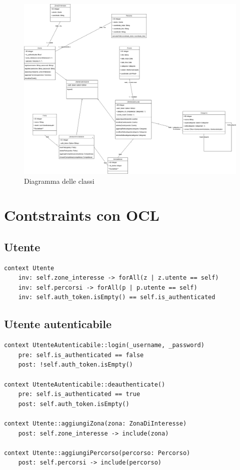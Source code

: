 \documentclass{article}
\begin{document}
\begin{figure}[htbp]
    \centering
    \includegraphics[width=1\textwidth]{Images/class_diagram.png}
    \caption{Diagramma delle classi}
    \label{fig:class-diagram}
\end{figure}

\clearpage

\section{Contstraints con OCL}

\subsection{Utente}

\begin{verbatim}
context Utente
    inv: self.zone_interesse -> forAll(z | z.utente == self)
    inv: self.percorsi -> forAll(p | p.utente == self)
    inv: self.auth_token.isEmpty() == self.is_authenticated
\end{verbatim}

\subsection{Utente autenticabile}

\begin{verbatim}
context UtenteAutenticabile::login(_username, _password)
    pre: self.is_authenticated == false
    post: !self.auth_token.isEmpty()

context UtenteAutenticabile::deauthenticate()
    pre: self.is_authenticated == true
    post: self.auth_token.isEmpty()

context Utente::aggiungiZona(zona: ZonaDiInteresse)
    post: self.zone_interesse -> include(zona)

context Utente::aggiungiPercorso(percorso: Percorso)
    post: self.percorsi -> include(percorso)
\end{verbatim}
\end{document}
